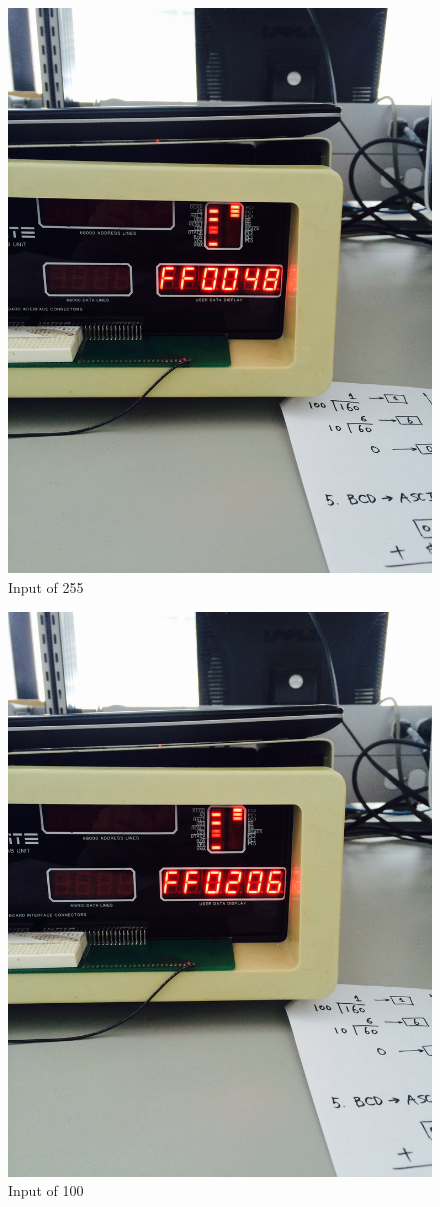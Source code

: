 \documentclass[12pt, twocolumn]{article}
\begin{document}
\begin{figure}[H]
\centering
\includegraphics[width=0.8\linewidth]{FullSizeRender_2}
\caption{Input of 255}
\label{fig:FullSizeRender_2}
\end{figure}

\begin{figure}[H]
\centering
\includegraphics[width=0.8\linewidth]{FullSizeRender_3}
\caption{Input of 100}
\label{fig:FullSizeRender_3}
\end{figure}
\end{document}
